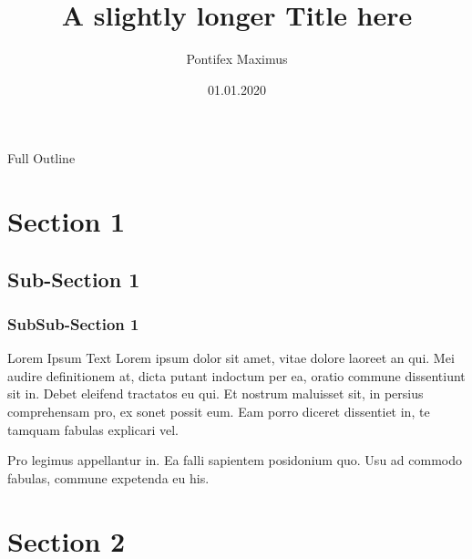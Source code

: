 \documentclass[11pt,usenames,dvipsnames]{beamer}
\author[P. Maximus]{Pontifex Maximus}
\title[My short Title]{A slightly longer Title here}
\institute{Basilica Sancti Petri}
\date[01.01.20]{01.01.2020}
\begin{document}

\hilumititlepage




\begin{frame}{Full Outline}
\tableofcontents
\end{frame}

\section{Section 1}
\subsection{Sub-Section 1}
\subsubsection{SubSub-Section 1}
\begin{frame}{Lorem Ipsum Text}
    Lorem ipsum dolor sit amet, vitae dolore laoreet an qui. 
    Mei audire definitionem at, dicta putant indoctum per ea, 
    oratio commune dissentiunt sit in. Debet eleifend tractatos eu qui. 
    Et nostrum maluisset sit, in persius comprehensam pro, ex sonet possit eum. 
    Eam porro diceret dissentiet in, te tamquam fabulas explicari vel.

    Pro legimus appellantur in\footnotemark[1]. Ea falli sapientem posidonium quo. 
    Usu ad commodo fabulas, commune expetenda eu his. 

\end{frame}

\section{Section 2}
\end{document}
